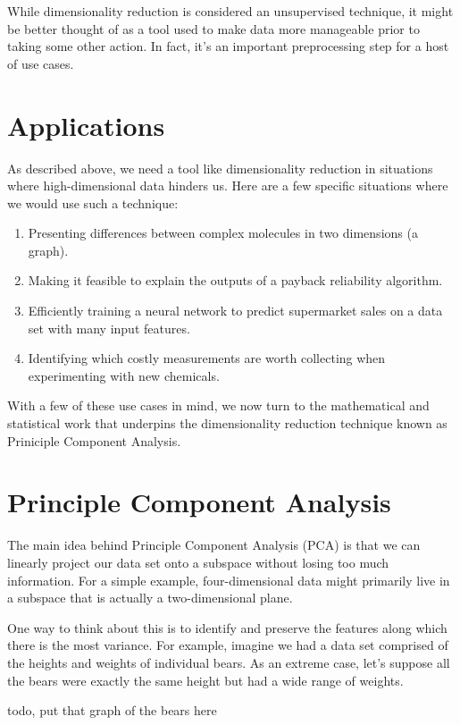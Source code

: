 While dimensionality reduction is considered an unsupervised technique, it might be better thought of as a tool used to make data more manageable prior to taking some other action. In fact, it's an important preprocessing step for a host of use cases.

\section{Applications}
As described above, we need a tool like dimensionality reduction in situations where high-dimensional data hinders us. Here are a few specific situations where we would use such a technique:

\begin{enumerate}
    \item Presenting differences between complex molecules in two dimensions (a graph).
    \item Making it feasible to explain the outputs of a payback reliability algorithm.
    \item Efficiently training a neural network to predict supermarket sales on a data set with many input features.
    \item Identifying which costly measurements are worth collecting when experimenting with new chemicals.
\end{enumerate}

With a few of these use cases in mind, we now turn to the mathematical and statistical work that underpins the dimensionality reduction technique known as Priniciple Component Analysis.

\section{Principle Component Analysis}
The main idea behind Principle Component Analysis (PCA) is that we can linearly project our data set onto a subspace without losing too much information. For a simple example, four-dimensional data might primarily live in a subspace that is actually a two-dimensional plane.

One way to think about this is to identify and preserve the features along which there is the most variance. For example, imagine we had a data set comprised of the heights and weights of individual bears. As an extreme case, let's suppose all the bears were exactly the same height but had a wide range of weights.

todo, put that graph of the bears here


